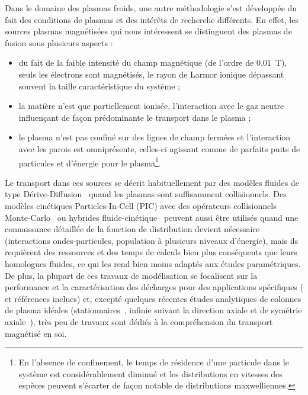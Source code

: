 \begin{refsection}
Dans le domaine des plasmas froids, une autre méthodologie s'est développée du
fait des conditions de plasmas et des intérêts de recherche
différents. En effet, les sources plasmas magnétisées qui nous intéressent
se distinguent des plasmas de fusion sous plusieurs aspects :

\begin{itemize}
  \item du fait de la faible intensité du champ magnétique (de l'ordre de
  0.01~T), seuls les électrons sont magnétisés, le rayon de Larmor ionique
  dépassant souvent la taille caractéristique du système ;
  \item la matière n'est que partiellement ionisée, l'interaction avec
  le gaz neutre influençant de façon prédominante le transport dans le plasma ;
  \item le plasma n'est pas confiné sur des lignes de champ fermées et
  l'interaction avec les parois est omniprésente, celles-ci agissant comme de
  parfaits puits de particules et d'énergie pour le plasma\footnote{
  En l'absence de confinement, le temps de résidence d'une particule dans le
  système est considérablement diminué et les distributions en vitesses des
  espèces peuvent s'écarter de façon notable de distributions maxwelliennes.}.
\end{itemize}

Le transport dans ces sources se décrit habituellement par des modèles fluides
de type Dérive-Diffusion~\parencite{Porteous,Lieberman,Rozhansky} quand les
plasmas sont suffisamment collisionnels. Des modèles
cinétiques Particles-In-Cell (PIC) avec des opérateurs collisionnels
Monte-Carlo~\parencite{PIC3D,Adam} ou hybrides
fluide-cinétique~\parencite{BoeufGarrigues} peuvent aussi être utilisés quand
une connaissance détaillée de la fonction de distribution devient nécessaire
(interactions ondes-particules, population à plusieurs niveaux d'énergie), mais
ils requièrent des ressources et des temps de calculs bien plus conséquents que
leurs homologues fluides, ce qui les rend bien moins adaptés aux études
paramétriques. De plus, la plupart de ces travaux de modélisation se focalisent
sur la performance et la caractérisation des décharges pour des applications
spécifiques (\parencite{Lieberman} et références inclues) et, excepté quelques
récentes études analytiques de colonnes de plasma idéales
(stationnaires~\parencite{Sternberg}, infinie suivant la direction axiale et de
symétrie axiale~\parencite{Fruchtman09}), très peu de travaux sont dédiés à la
compréhension du transport magnétisé en soi.


\end{refsection}

